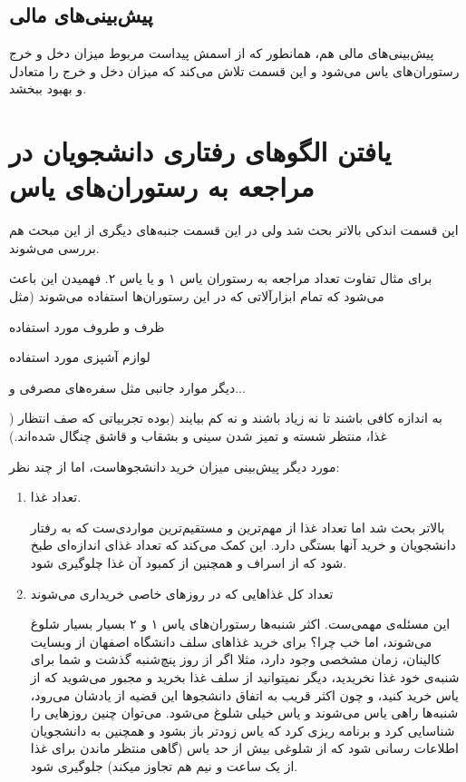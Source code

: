 \documentclass{article}
\begin{document}
	    \subsection{پیش‌بینی‌های مالی}
	    	پیش‌بینی‌های مالی هم، همانطور که از اسمش پیداست مربوط میزان دخل و خرج رستوران‌های یاس می‌شود و این قسمت تلاش می‌کند که میزان دخل و خرج را متعادل و بهبود ببخشد.
	    	
	\section{یافتن الگو‌های رفتاری دانشجویان در مراجعه به رستوران‌های یاس}
		این قسمت اندکی بالاتر بحث شد ولی در این قسمت جنبه‌های دیگری از این مبحث هم بررسی می‌شوند.
		
		برای مثال تفاوت تعداد مراجعه‌ به رستوران یاس ۱ و یا یاس ۲. فهمیدن این باعث می‌شود که تمام ابزار‌آلاتی که در این رستوران‌‌ها استفاده می‌شوند (مثل
		\begin{enumerate*}
			\item ظرف و طروف مورد استفاده
			\item لوازم آشپزی مورد استفاده 
			\item دیگر موارد جانبی مثل سفره‌های مصرفی و...
		\end{enumerate*})
	به اندازه کافی باشند تا نه زیاد باشند و نه کم بیایند (بوده تجربیاتی که صف انتظار غذا، منتظر شسته و تمیز شدن سینی و بشقاب و قاشق چنگال شده‌اند.)
	
	مورد دیگر پیش‌بینی میزان خرید دانشجو‌هاست، اما از چند نظر:
	\begin{enumerate}
		\item 
		تعداد غذا.
		
		بالاتر بحث شد اما تعداد غذا از مهم‌ترین و مستقیم‌ترین مواردی‌ست که به رفتار دانشجویان و خرید آنها بستگی دارد. این کمک می‌کند که تعداد غذای اندازه‌ای طبخ شود که از اسراف و همچنین از کمبود آن غذا چلوگیری شود.
		
		\item تعداد کل غذاهایی که در روز‌های خاصی خریداری می‌شوند
		
		این مسئله‌ی مهمی‌ست. اکثر شنبه‌ها رستوران‌های یاس ۱ و ۲ بسیار بسیار شلوغ می‌شوند، اما خب چرا؟
		برای خرید غذاهای سلف دانشگاه اصفهان از وبسایت کالینان، زمان مشخصی وجود دارد، مثلا اگر از روز پنچ‌شنبه گذشت و شما برای شنبه‌ی خود غذا نخریدید، دیگر نمیتوانید از سلف غذا بخرید و مجبور می‌شوید که از یاس خرید کنید، و چون اکثر قریب به اتفاق دانشجو‌‌ها این قضیه از یادشان می‌رود، شنبه‌ها راهی یاس می‌شوند و یاس خیلی شلوغ می‌شود. می‌توان چنین روز‌هایی را شناسایی کرد و برنامه ریزی کرد که یاس زودتر باز بشود و همچنین به دانشجویان اطلاعات رسانی شود که از شلوغی بیش از حد یاس (گاهی منتظر ماندن برای غذا از یک ساعت و نیم هم تجاوز میکند) جلوگیری شود.
	\end{enumerate}
	
\end{document}
